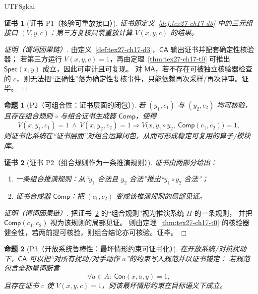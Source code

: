 \documentclass[12pt]{article}
\newtheorem{proposition}{命题}[section]
\newtheorem{Certificate}{证书}[section]
\begin{document}
\begin{CJK*}{UTF8}{gkai}
\begin{Certificate}[证书 P1（核验可重放接口）]
\label{cert:tex27-ch17-p1}
证书即定义~\ref{def:tex27-ch17-d3} 中的三元组接口 $(V,y,c)$：第三方复核只需重放计算 $V(x,y,c)$ 的结果。
\end{Certificate}

\begin{proof}[证明（谓词因果链）]
由定义~\ref{def:tex27-ch17-d3}，$\mathsf{CA}$ 输出证书并配套确定性核验器；
若第三方运行 $V(x,y,c)=1$，再由定理~\ref{thm:tex27-ch17-t0} 可推出 $\mathsf{Spec}(x,y)$ 成立，因此可审计且可复现。
对 $\mathsf{MA}$，若不存在可被独立核验器检查的 $c$，则无法把“正确性”落为确定性复核事件，只能依赖再次采样/再次评审。证毕。
\end{proof}

\begin{proposition}[P2（可组合性：证书层面的闭包）]
\label{prop:tex27-ch17-p2}
若 $(y_1,c_1)$ 与 $(y_2,c_2)$ 均可核验，且存在组合规则 $\circ$ 与组合证书生成器 $\mathsf{Comp}$，使得
\[
  V(x,y_1,c_1)=1\ \wedge\ V(x,y_2,c_2)=1
  \Longrightarrow
  V\bigl(x, y_1\circ y_2,\ \mathsf{Comp}(c_1,c_2)\bigr)=1,
\]
则证书化系统在“证书层面”对组合运算闭包，从而可形成稳定可复用的算子/模块库。
\end{proposition}

\begin{Certificate}[证书 P2（组合规则作为一条推演规则）]
\label{cert:tex27-ch17-p2}
证书由两部分给出：
\begin{enumerate}
  \item 一条组合推演规则：从“$y_1$ 合法且 $y_2$ 合法”推出“$y_1\circ y_2$ 合法”；
  \item 证书合成器 $\mathsf{Comp}$：把 $(c_1,c_2)$ 变成该推演规则的局部见证。
\end{enumerate}
\end{Certificate}

\begin{proof}[证明（谓词因果链）]
把证书~\ref{cert:tex27-ch17-p2} 的“组合规则”视为推演系统 $\Pi$ 的一条规则，
并把 $\mathsf{Comp}(c_1,c_2)$ 视为该规则的局部见证。
则由定理~\ref{thm:tex27-ch17-t0} 的核验器健全性，若两前提可核验，则组合结论亦可核验。证毕。
\end{proof}

\begin{proposition}[P3（开放系统鲁棒性：最坏情形约束可证书化）]
\label{prop:tex27-ch17-p3}
在开放系统/对抗扰动下，$\mathsf{CA}$ 可以把“对所有扰动/对手动作 $a$”的约束写入规范并以证书锚定：
若规范包含全称量词断言
\[
  \forall a\in A:\ \mathsf{Con}(x,a,y)=1,
\]
且存在证书 $c$ 使 $V(x,y,c)=1$，则该最坏情形约束在目标语义下成立。
\end{proposition}


\end{CJK*}
\end{document}
